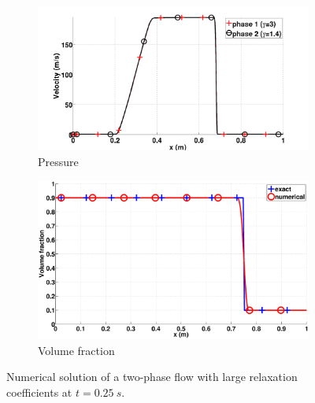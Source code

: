 \documentclass[preprint,10pt]{elsarticle}
\begin{document}
\begin{figure}[H]
        \begin{subfigure}[b]{0.495\textwidth}
                \centering
                \includegraphics[width=\textwidth]{figures/relaxation_two_phases_velocity.png}
                \caption{Pressure}
                \label{fig:adv-vf-press}
        \end{subfigure}        
        \begin{subfigure}[b]{0.495\textwidth}
                \centering
                \includegraphics[width=\textwidth]{figures/advection-vol-fraction.eps}
                \caption{Volume fraction}
                \label{fig:adv-vf-vf}
        \end{subfigure}
        \caption{Numerical solution of a two-phase flow with large relaxation coefficients at $t=0.25 \ s$.}\label{fig:adv-vf-variables}
\end{figure}
%
\end{document}
